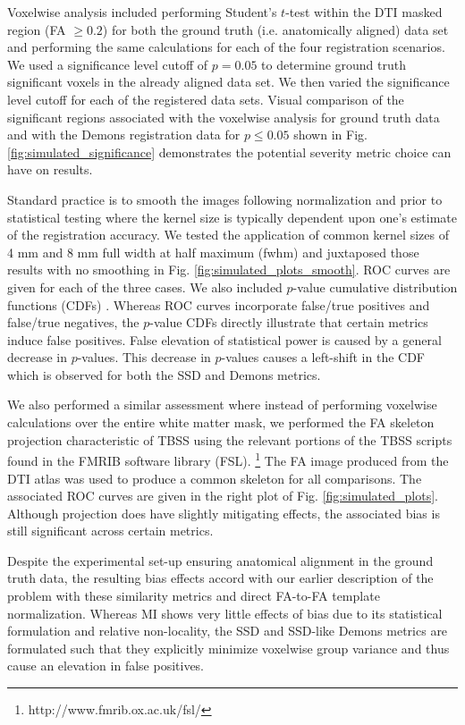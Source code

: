 \documentclass[final,5p,times,twocolumn]{elsarticle}
\begin{document}
Voxelwise analysis included performing Student's $t$-test within the
DTI masked region (FA $\geq 0.2$) for both the ground truth (i.e.
anatomically aligned) data set and performing the same calculations
for each of the four registration scenarios.  We used a significance
level cutoff of $p = 0.05$ to determine ground truth significant
voxels in the already aligned data set.  We then varied the 
significance level cutoff for each of the registered data sets.
Visual comparison of the significant regions associated with the 
voxelwise analysis for ground truth data and with the Demons registration data for
$p \leq 0.05$ shown in Fig. \ref{fig:simulated_significance} demonstrates 
the potential severity metric choice can have on results.

Standard practice is to smooth the images following normalization and
prior to statistical testing where the kernel size is typically dependent upon
one's estimate of the registration accuracy.  We tested the application
of common kernel sizes of 4 mm and 8 mm full width at half
maximum (fwhm) and juxtaposed those results with no smoothing in
Fig. \ref{fig:simulated_plots_smooth}.  ROC curves are given
for each of the three cases.
We also included $p$-value cumulative distribution functions (CDFs) \cite{yanovsky2009}.
Whereas ROC curves incorporate false/true positives and false/true
negatives, the $p$-value CDFs directly illustrate that certain metrics 
induce false positives.  False elevation of statistical power is caused
by a general decrease in $p$-values.  This decrease in $p$-values causes
a left-shift in the CDF which is observed for both the SSD and Demons metrics.

We also performed a similar assessment
where instead of performing voxelwise calculations over the entire
white matter mask, we performed the FA skeleton projection characteristic
of TBSS using the relevant portions of the TBSS scripts found in the 
FMRIB software library (FSL).%
\footnote{
http://www.fmrib.ox.ac.uk/fsl/
}
The FA 
image produced from the
DTI atlas was used to produce a common skeleton for all comparisons.
The associated ROC curves are given
in the right plot of Fig. \ref{fig:simulated_plots}.  Although projection
does have slightly mitigating effects, the associated bias is still 
significant across certain metrics.  


Despite the experimental set-up ensuring anatomical alignment in the
ground truth data, the resulting bias effects accord with our earlier 
description of the problem with these similarity metrics and direct
FA-to-FA template normalization.  
Whereas MI shows very little effects of bias due to its statistical
formulation and relative non-locality, the SSD and SSD-like Demons
metrics are formulated such that they explicitly minimize voxelwise
group variance and thus cause an elevation in false positives.
\end{document}
